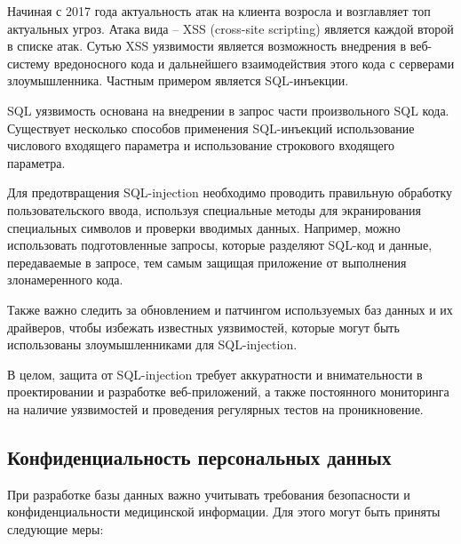 Начиная с 2017 года актуальность атак на клиента возросла и возглавляет топ актуальных угроз. Атака вида – XSS (cross-site scripting) является каждой второй в списке атак. Сутью XSS уязвимости является возможность внедрения в веб-систему вредоносного кода и дальнейшего взаимодействия этого кода с серверами злоумышленника. Частным примером является SQL-инъекции.

SQL уязвимость основана на внедрении в запрос части произвольного SQL кода. Существует несколько способов применения SQL-инъекций использование числового входящего параметра и использование строкового входящего параметра.

Для предотвращения SQL-injection необходимо проводить правильную обработку пользовательского ввода, используя специальные методы для экранирования специальных символов и проверки вводимых данных. Например, можно использовать подготовленные запросы, которые разделяют SQL-код и данные, передаваемые в запросе, тем самым защищая приложение от выполнения злонамеренного кода.

Также важно следить за обновлением и патчингом используемых баз данных и их драйверов, чтобы избежать известных уязвимостей, которые могут быть использованы злоумышленниками для SQL-injection.

В целом, защита от SQL-injection требует аккуратности и внимательности в проектировании и разработке веб-приложений, а также постоянного мониторинга на наличие уязвимостей и проведения регулярных тестов на проникновение.




\subsection{Конфиденциальность персональных данных}

При разработке базы данных важно учитывать требования безопасности и конфиденциальности медицинской информации. Для этого могут быть приняты следующие меры:

